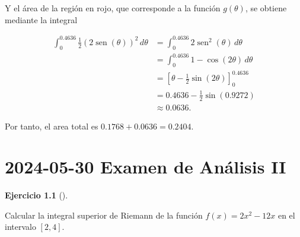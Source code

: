 \documentclass[
  spanish,
  a4paper,
]{scrreport}
\theoremstyle{definition}
\newtheorem{exercise}{Ejercicio}[chapter]
\theoremstyle{remark}
\begin{document}
\begin{tcolorbox}
Y el área de la región en rojo, que corresponde a la función
\(g(\theta)\), se obtiene mediante la integral

\begin{align*}
\int_{0}^{0.4636} \frac{1}{2}(2\operatorname{sen}(\theta))^2\, d\theta 
&= \int_{0}^{0.4636} 2\operatorname{sen}^2(\theta)\, d\theta \\
&= \int_{0}^{0.4636} 1 - \cos(2\theta)\, d\theta \\
&= \left[\theta - \frac{1}{2}\sin(2\theta)\right]_{0}^{0.4636} \\
&= 0.4636 - \frac{1}{2}\sin(0.9272) \\
&\approx 0.0636.
\end{align*}

Por tanto, el area total es \(0.1768 + 0.0636 = 0.2404\).

\end{tcolorbox}


\chapter{\texorpdfstring{2024-05-30 Examen de Análisis
II}{2024-05-30  Examen de Análisis II}}\label{examen-de-anuxe1lisis-ii-3}

\begin{exercise}[]\protect\hypertarget{exr-1}{}\label{exr-1}

Calcular la integral superior de Riemann de la función
\(f(x) = 2x^2-12x\) en el intervalo \([2,4]\).

\end{exercise}
\end{document}
